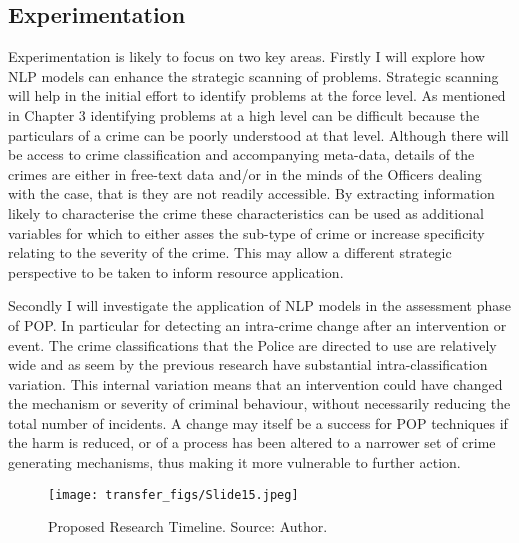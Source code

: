 \subsection{Experimentation} Experimentation is likely to focus on two key areas. Firstly I will explore how NLP models can enhance the strategic scanning of problems.  Strategic scanning will help in the initial effort to identify problems at the force level. As mentioned in Chapter 3 identifying problems at a high level can be difficult because the particulars of a crime can be poorly understood at that level. Although there will be access to crime classification and accompanying meta-data, details of the crimes are either in free-text data and/or in the minds of the Officers dealing with the case, that is they are not readily accessible. By extracting information likely to characterise the crime these characteristics can be used as additional variables for which to either asses the sub-type of crime or increase specificity relating to the severity of the crime. This may allow a different strategic perspective to be taken to inform resource application. 

Secondly I will investigate the application of NLP models in the assessment phase of POP. In particular for detecting an intra-crime change after an intervention or event. The crime classifications that the Police are directed to use are relatively wide and as seem by the previous research \parencite{kuang2017crime, birks2020unsupervised} have substantial intra-classification variation. This internal variation means that an intervention could have changed the mechanism or severity of criminal behaviour, without necessarily reducing the total number of incidents. A change may itself be a success for POP techniques if the harm is reduced, or of a process has been altered to a narrower set of crime generating mechanisms, thus making it more vulnerable to further action.

 
 

\begin{figure}
  \texttt{[image: transfer\_figs/Slide15.jpeg]}
  \caption[Proposed Research Timeline.]{Proposed Research Timeline. Source: Author.}
  \label{fig:timeline}
\end{figure}

